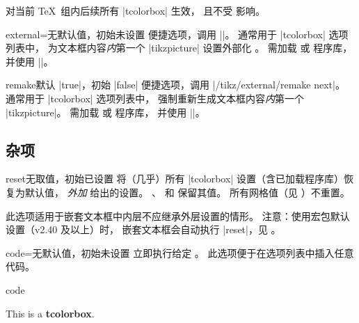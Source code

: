 \begin{marker}
 对当前 \TeX\ 组内后续所有 |tcolorbox| 生效，
且不受  影响。
\end{marker}

\begin{docTcbKey}{external}{=}{无默认值，初始未设置}
  便捷选项，调用 ||。
  通常用于 |tcolorbox| 选项列表中，
  为文本框内容\emph{内}第一个 |tikzpicture| 设置外部化 。
  需加载  \cite{tantau:tikz_and_pgf} 或  程序库，
  并使用 |\usetikzlibrary{external}|。
\end{docTcbKey}

\begin{docTcbKey}{remake}{}{默认 |true|，初始 |false|}
  便捷选项，调用 |/tikz/external/remake next|。
  通常用于 |tcolorbox| 选项列表中，
  强制重新生成文本框内容\emph{内}第一个 |tikzpicture|。
  需加载  \cite{tantau:tikz_and_pgf} 或  程序库，
  并使用 |\usetikzlibrary{external}|。
\end{docTcbKey}


\clearpage
\subsection{杂项}
\begin{docTcbKey}{reset}{}{无取值，初始已设置}
将（几乎）所有 |tcolorbox| 设置（含已加载程序库）恢复为默认值，
\emph{外加}  给出的设置。
、 和
 保留其值。
所有网格值（见 ）不重置。

此选项适用于嵌套文本框中内层不应继承外层设置的情形。
注意：使用宏包默认设置（v2.40 及以上）时，
嵌套文本框会自动执行 |reset|，见 。
\end{docTcbKey}




\begin{docTcbKey}{code}{=}{无默认值，初始未设置}
  立即执行给定 。
  此选项便于在选项列表中插入任意代码。
\begin{exdispExample}{code}

\begin{tcolorbox}[code={\newcommand{\mycommand}{\textit{working}}},
  title=My \mycommand\ title]
This is a \textbf{tcolorbox}.
\end{tcolorbox}
\end{exdispExample}
\end{docTcbKey}


